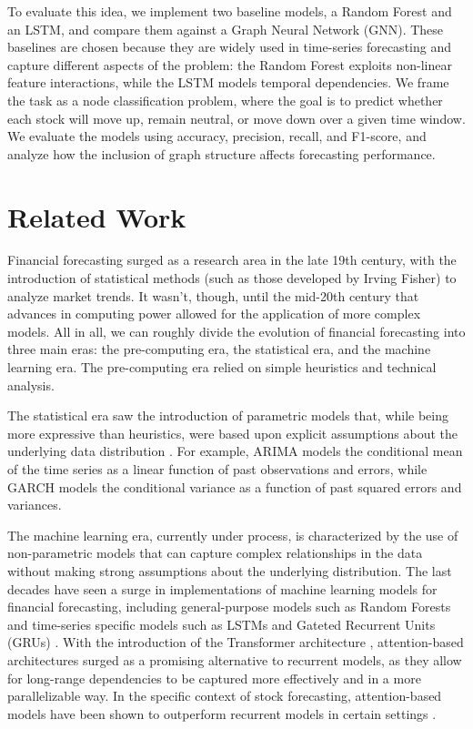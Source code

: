\documentclass{article}
\begin{document}
To evaluate this idea, we implement two baseline models, a Random Forest and an LSTM, and compare them against a Graph Neural Network (GNN). These baselines are chosen because they are widely used in time-series forecasting and capture different aspects of the problem: the Random Forest exploits non-linear feature interactions, while the LSTM models temporal dependencies. We frame the task as a node classification problem, where the goal is to predict whether each stock will move up, remain neutral, or move down over a given time window. We evaluate the models using accuracy, precision, recall, and F1-score, and analyze how the inclusion of graph structure affects forecasting performance.
\newpage
\section{Related Work}

Financial forecasting surged as a research area in the late 19th century, with the introduction of statistical methods (such as those developed by Irving Fisher) to analyze market trends. It wasn't, though, until the mid-20th century that advances in computing power allowed for the application of more complex models. All in all, we can roughly divide the evolution of financial forecasting into three main eras: the pre-computing era, the statistical era, and the machine learning era. The pre-computing era relied on simple heuristics and technical analysis.

The statistical era saw the introduction of parametric models that, while being more expressive than heuristics, were based upon explicit assumptions about the underlying data distribution \cite{traditional_dl_stock_prediction}. For example, ARIMA models the conditional mean of the time series as a linear function of past observations and errors, while GARCH models the conditional variance as a function of past squared errors and variances.

The machine learning era, currently under process, is characterized by the use of non-parametric models that can capture complex relationships in the data without making strong assumptions about the underlying distribution. The last decades have seen a surge in implementations of machine learning models for financial forecasting, including general-purpose models such as Random Forests \cite{rf_stock_prediction} and time-series specific models such as LSTMs \cite{stock_prediction_lstm} and Gateted Recurrent Units (GRUs) \cite{rnn_gru_lstm_comparison}. With the introduction of the Transformer architecture \cite{attention_is_all_you_need}, attention-based architectures surged as a promising alternative to recurrent models, as they allow for long-range dependencies to be captured more effectively and in a more parallelizable way. In the specific context of stock forecasting, attention-based models have been shown to outperform recurrent models in certain settings \cite{attention_transformers_stock_prediction}.
\end{document}
